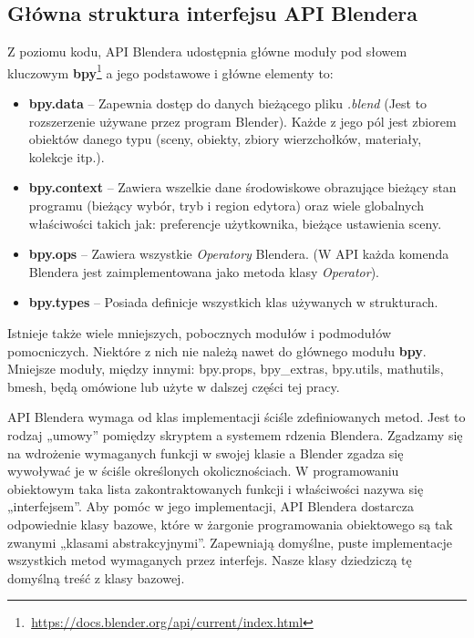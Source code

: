 \documentclass{xmgr}
\begin{document}
\subsection{Główna struktura interfejsu API Blendera}
Z poziomu kodu, API Blendera udostępnia główne moduły pod słowem kluczowym \textbf{bpy}\footnote{\,\url{https://docs.blender.org/api/current/index.html}} a jego podstawowe i główne elementy to:
\begin{itemize}
\item \textbf{bpy.data} -- Zapewnia dostęp do danych bieżącego pliku \emph{.blend} (Jest to rozszerzenie używane przez program Blender). Każde z jego pól jest zbiorem obiektów danego typu (sceny, obiekty, zbiory wierzchołków, materiały, kolekcje itp.).
\item \textbf{bpy.context} -- Zawiera wszelkie dane środowiskowe obrazujące bieżący stan programu (bieżący wybór, tryb i region edytora) oraz wiele globalnych właściwości takich jak: preferencje użytkownika, bieżące ustawienia sceny.
\item \textbf{bpy.ops} -- Zawiera wszystkie \emph{Operatory} Blendera. (W API każda komenda Blendera jest zaimplementowana jako metoda klasy \emph{Operator}).
\item \textbf{bpy.types} -- Posiada definicje wszystkich klas używanych w strukturach.
\end{itemize}
Istnieje także wiele mniejszych, pobocznych modułów i podmodułów pomocniczych. Niektóre z nich nie należą nawet do głównego modułu \textbf{bpy}. Mniejsze moduły, między innymi: bpy.props, bpy\_extras, bpy.utils, mathutils, bmesh, będą omówione lub użyte w dalszej części tej pracy.

API Blendera wymaga od klas implementacji ściśle zdefiniowanych metod. Jest to rodzaj „umowy” pomiędzy skryptem a systemem rdzenia Blendera. Zgadzamy się na wdrożenie wymaganych funkcji w swojej klasie a Blender zgadza się wywoływać je w ściśle określonych okolicznościach. W programowaniu obiektowym taka lista zakontraktowanych funkcji i właściwości nazywa się „interfejsem”. Aby pomóc w jego implementacji, API Blendera dostarcza odpowiednie klasy bazowe, które w żargonie programowania obiektowego są tak zwanymi „klasami abstrakcyjnymi”. Zapewniają domyślne, puste implementacje wszystkich metod wymaganych przez interfejs. Nasze klasy dziedziczą tę domyślną treść z klasy bazowej.
\end{document}
